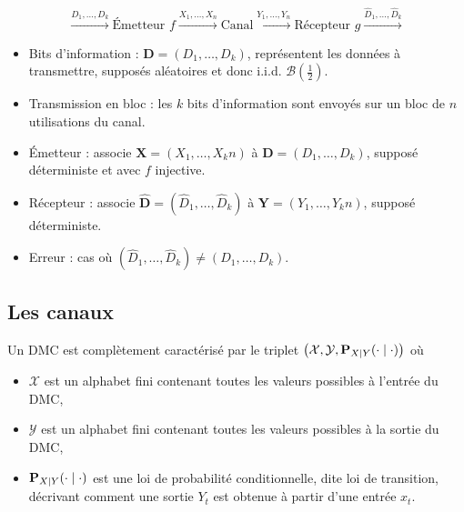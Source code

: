 \begin{defn}
	$$\overset{D_1,\ldots,D_k}{\longrightarrow}
		\text{Émetteur } f
	\overset{X_1,\ldots,X_n}{\longrightarrow}
		\text{Canal}
	\overset{Y_1,\ldots,Y_n}{\longrightarrow}
		\text{Récepteur } g
	\overset{\hat{D}_1,\ldots,\hat{D}_k}{\longrightarrow}$$
\end{defn}

\begin{voc}
	\begin{itemize}
		\item[\textbullet] Bits d'information : $\mathbf{D} = (D_1,\ldots,D_k)$, représentent les données à transmettre, supposés aléatoires et donc i.i.d. $\mathcal{B} \left( \frac{1}{2} \right) $.
		\item[\textbullet] Transmission en bloc : les $k$ bits d'information sont envoyés sur un bloc de $n$ utilisations du canal.
		\item[\textbullet] Émetteur : associe $\mathbf{X} = (X_1,\ldots,X_kn)$ à $\mathbf{D} = (D_1,\ldots,D_k)$, supposé déterministe et avec $f$ injective.
		\item[\textbullet] Récepteur : associe $\mathbf{\hat{D}} = \left( \hat{D}_1,\ldots,\hat{D}_k \right)$ à $\mathbf{Y} = (Y_1,\ldots,Y_kn)$, supposé déterministe.
		\item[\textbullet] Erreur : cas où $\left( \hat{D}_1,\ldots,\hat{D}_k \right) \neq (D_1,\ldots,D_k)$.
	\end{itemize}
\end{voc}


\subsection{Les canaux}

	\begin{defn}
		Un DMC est complètement caractérisé par le triplet $\left( \mathcal{X}, \mathcal{Y}, \mathbf{P}_{X \mid Y}(\cdot \mid \cdot) \right)$ où
		\begin{itemize}
			\item $\mathcal{X}$ est un alphabet fini contenant toutes les valeurs possibles à l'entrée du DMC,
			\item $\mathcal{Y}$ est un alphabet fini contenant toutes les valeurs possibles à la sortie du DMC,
			\item $\mathbf{P}_{X \mid Y}(\cdot \mid \cdot)$ est une loi de probabilité conditionnelle, dite loi de transition, décrivant comment une sortie $Y_t$ est obtenue à partir d'une entrée $x_t$.
		\end{itemize}
	\end{defn}

